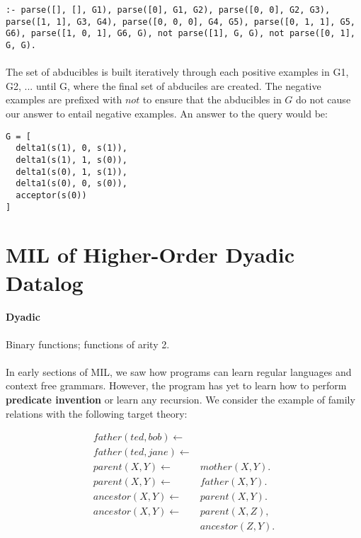 \documentclass{article}
\theoremstyle{plain}
\theoremstyle{definition}
\begin{document}
\begin{multicols}{2}
\begin{lstlisting}
:- parse([], [], G1), parse([0], G1, G2), parse([0, 0], G2, G3), parse([1, 1], G3, G4), parse([0, 0, 0], G4, G5), parse([0, 1, 1], G5, G6), parse([1, 0, 1], G6, G), not parse([1], G, G), not parse([0, 1], G, G).
\end{lstlisting}

\paragraph{} The set of abducibles is built iteratively through each positive examples in G1, G2, ... until G, where the final set of abduciles are created. The negative examples are prefixed with $not$ to ensure that the abducibles in $G$ do not cause our answer to entail negative examples. An answer to the query would be:

\begin{lstlisting}
G = [
  delta1(s(1), 0, s(1)),
  delta1(s(1), 1, s(0)),
  delta1(s(0), 1, s(1)),
  delta1(s(0), 0, s(0)),
  acceptor(s(0))
]
\end{lstlisting}

\section{MIL of Higher-Order Dyadic Datalog}

\paragraph{Dyadic} Binary functions; functions of arity 2.

\paragraph{} In early sections of MIL, we saw how programs can learn regular languages and context free grammars. However, the program has yet to learn how to perform \textbf{predicate invention} or learn any recursion. We consider the example of family relations with the following target theory:

\begin{align*}
father(ted, bob) \leftarrow&\\
father(ted, jane) \leftarrow&\\
parent(X, Y) \leftarrow\ &mother(X, Y).\\
parent(X, Y) \leftarrow\ &father(X, Y).\\
ancestor(X, Y) \leftarrow\ &parent(X, Y).\\
ancestor(X, Y) \leftarrow\ &parent(X, Z),\\ &ancestor(Z, Y).\\
\end{align*}


\end{multicols}
\end{document}
